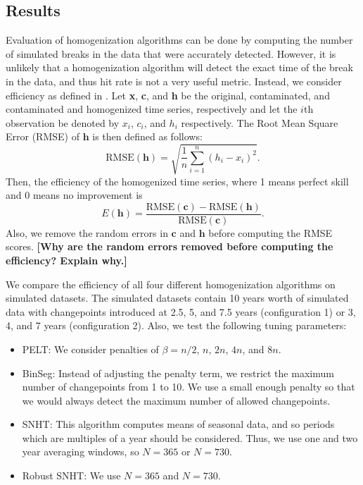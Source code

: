 \documentclass[12pt]{article}
\begin{document}
\begin{doublespacing}
\subsection{Results}

\label{sec:HomResults}

Evaluation of homogenization algorithms can be done by computing the number of simulated breaks in the data that were accurately detected.  However, it is unlikely that a homogenization algorithm will detect the exact time of the break in the data, and thus hit rate is not a very useful metric.  Instead, we consider efficiency as defined in \cite{domonkos13}.  Let \textbf{x}, \textbf{c}, and \textbf{h} be the original, contaminated, and contaminated and homogenized time series, respectively and let the $i$th observation be denoted by $x_i$, $c_i$, and $h_i$ respectively.  The Root Mean Square Error (RMSE) of $\mathbf{h}$ is then defined as follows:
\begin{equation*}
	\mbox{RMSE}(\textbf{h}) = \sqrt{\frac{1}{n} \sum_{i=1}^n (h_i-x_i)^2}.
\end{equation*}
Then, the efficiency of the homogenized time series, where 1 means perfect skill and 0 means no improvement is
\begin{equation*}
	E(\mathbf{h}) = \frac{\mbox{RMSE}(\textbf{c})-\mbox{RMSE}(\textbf{h})}{\mbox{RMSE}(\textbf{c})}.
\end{equation*}
Also, we remove the random errors in $\mathbf{c}$ and $\mathbf{h}$ before computing the RMSE scores. \textbf{[Why are the random errors removed before computing the efficiency?  Explain why.]}

We compare the efficiency of all four different homogenization algorithms on simulated datasets.  The simulated datasets contain 10 years worth of simulated data with changepoints introduced at 2.5, 5, and 7.5 years (configuration 1) or 3, 4, and 7 years (configuration 2).  Also, we test the following  tuning parameters:

\begin{itemize}
	\item PELT: We consider penalties of $\beta=n/2$, $n$, $2n$, $4n$, and  $8n$.
	\item BinSeg: Instead of adjusting the penalty term, we restrict the maximum number of changepoints from 1 to 10.  We use a small enough penalty so that we would always detect the maximum number of allowed changepoints.
	\item SNHT: This algorithm computes means of seasonal data, and so periods which are multiples of a year should be considered.  Thus, we use one and two year averaging windows, so $N=365$ or $N=730$.
	\item Robust SNHT: We  use $N=365$ and $N= 730$.
\end{itemize}


\end{doublespacing}
\end{document}

